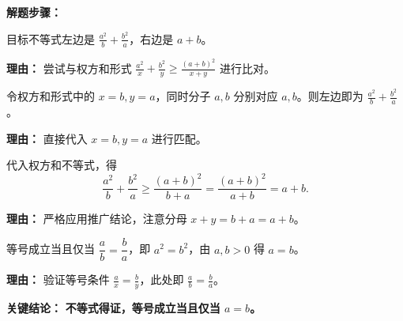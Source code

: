 \begin{examplebox}
\textbf{\textcolor{CExample}{解题步骤：}}
\begin{description}[style=nextline, leftmargin=2.8em, labelsep=0.5em, itemsep=0.45em]
    \item[\textbf{第一步（观察目标）：}] 目标不等式左边是 $\frac{a^2}{b}+\frac{b^2}{a}$，右边是 $a+b$。
    \par\textbf{理由：} 尝试与权方和形式 $\frac{a^2}{x}+\frac{b^2}{y} \ge \frac{(a+b)^2}{x+y}$ 进行比对。
    \item[\textbf{第二步（匹配系数）：}] 令权方和形式中的 $x=b, y=a$，同时分子 $a,b$ 分别对应 $a,b$。则左边即为 $\frac{a^2}{b}+\frac{b^2}{a}$。
    \par\textbf{理由：} 直接代入 $x=b, y=a$ 进行匹配。
    \item[\textbf{第三步（应用不等式）：}] 代入权方和不等式，得
    \[
    \frac{a^2}{b} + \frac{b^2}{a} \ge \frac{(a+b)^2}{b+a} = \frac{(a+b)^2}{a+b} = a+b.
    \]
    \par\textbf{理由：} 严格应用推广结论，注意分母 $x+y=b+a=a+b$。
    \item[\textbf{第四步（取等条件）：}] 等号成立当且仅当 $\dfrac{a}{b} = \dfrac{b}{a}$，即 $a^2=b^2$，由 $a,b>0$ 得 $a=b$。
    \par\textbf{理由：} 验证等号条件 $\frac{a}{x}=\frac{b}{y}$，此处即 $\frac{a}{b}=\frac{b}{a}$。
\end{description}
\textbf{\textcolor{CExample}{关键结论：}} \textbf{不等式得证，等号成立当且仅当 $a=b$。}
\end{examplebox}
